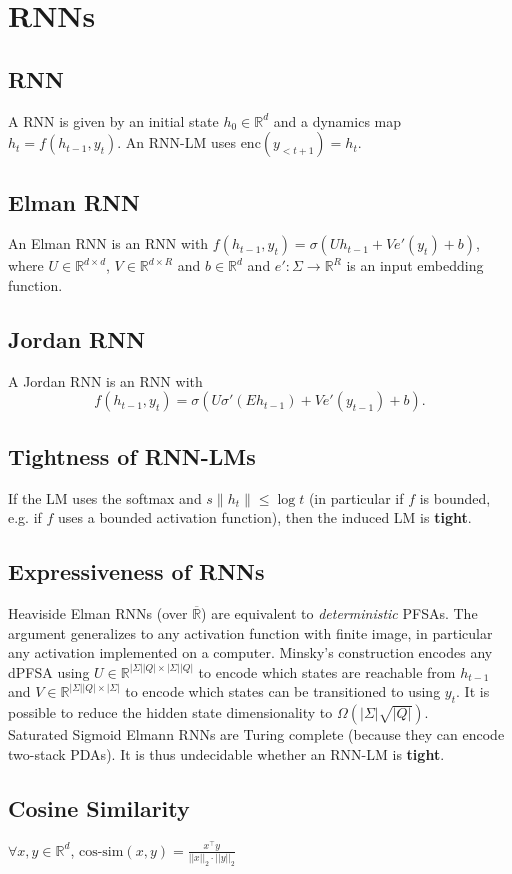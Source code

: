 \section{RNNs}
\subsection*{RNN}
A RNN is given by an initial state $h_0\in\mathbb{R}^d$ and a dynamics map $h_{t}=f(h_{t-1},y_{t})$. An RNN-LM uses $\text{enc}(y_{<t+1})=h_t$.

\subsection*{Elman RNN}
An Elman RNN is an RNN with $f(h_{t-1},y_t)=\sigma(U h_{t-1}+Ve'( y_t)+b)$, where $U\in\mathbb{R}^{d\times d}$, $V\in \mathbb{R}^{d\times R}$ and $b\in\mathbb{R}^d$ and $e':\Sigma\rightarrow\mathbb{R}^R$ is an input embedding function.\\

\subsection*{Jordan RNN}
A Jordan RNN is an RNN with $$f(h_{t-1},y_t)=\sigma(U \sigma'(Eh_{t-1})+V e'(y_{t-1})+b).$$

\subsection*{Tightness of RNN-LMs}
If the LM uses the softmax and $s\|h_t\|\leq\log t$ (in particular if $f$ is bounded, e.g. if $f$ uses a bounded activation function), then the induced LM is \textbf{tight}.

\subsection*{Expressiveness of RNNs}
Heaviside Elman RNNs (over $\overline{\mathbb{R}}$) are equivalent to \textit{deterministic} PFSAs. The argument generalizes to any activation function with finite image, in particular any activation implemented on a computer. Minsky's construction encodes any dPFSA using $U\in \mathbb{R}^{|\Sigma||Q|\times |\Sigma||Q|}$ to encode which states are reachable from $h_{t-1}$ and $V\in\mathbb{R}^{|\Sigma||Q|\times |\Sigma|}$ to encode which states can be transitioned to using $y_t$. It is possible to reduce the hidden state dimensionality to
$\Omega(|\Sigma|\sqrt{|Q|}).$\\
Saturated Sigmoid Elmann RNNs are Turing complete (because they can encode two-stack PDAs). It is thus undecidable whether an RNN-LM is \textbf{tight}.

\subsection*{Cosine Similarity}
$\forall x,y\in\mathbb{R}^d$, $\text{cos-sim}(x, y)=\frac{x^\top y}{||x||_2 \cdot ||y||_2}$